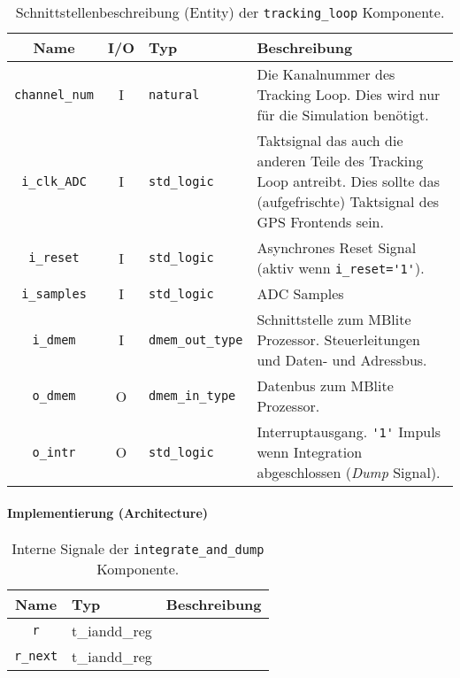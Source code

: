 \begin{table}[htbp]
    \ttabbox
    {
        \caption[Carrier NCO Schnittstelle]{Schnittstellenbeschreibung (Entity) der \lstinline$tracking_loop$ Komponente.}
        \label{Tab_tracking_loop_Entity}
    }
    {
    \begin{tabular}{c c  p{2cm} p{6cm}}
        \toprule
        Name                    & I/O	& Typ				& Beschreibung \\
        \midrule
        \lstinline$channel_num$	& I	& \lstinline$natural$		& Die Kanalnummer des Tracking Loop. Dies wird nur für die Simulation benötigt. \\
        \lstinline$i_clk_ADC$	& I	& \lstinline$std_logic$		& Taktsignal das auch die anderen Teile des Tracking Loop antreibt. Dies sollte das (aufgefrischte) Taktsignal des GPS Frontends sein.\\
        \lstinline$i_reset$	& I	& \lstinline$std_logic$		& Asynchrones Reset Signal (aktiv wenn \lstinline$i_reset='1'$). \\
        \lstinline$i_samples$	& I	& \lstinline$std_logic$		& ADC Samples \\
        \lstinline$i_dmem$	& I	& \lstinline$dmem_out_type$	& Schnittstelle zum MBlite Prozessor. Steuerleitungen und Daten- und Adressbus. \\
        \lstinline$o_dmem$	& O	& \lstinline$dmem_in_type$	& Datenbus zum MBlite Prozessor. \\
        \lstinline$o_intr$	& O	& \lstinline$std_logic$		& Interruptausgang. \lstinline$'1'$ Impuls wenn Integration abgeschlossen (\emph{Dump} Signal).\\
        \bottomrule
    \end{tabular}
}
\end{table}

\paragraph{Implementierung (Architecture)}

\begin{table}[htbp]
    \ttabbox
    {
        \caption[Carrier NCO interne Signale]{Interne Signale der \lstinline$integrate_and_dump$ Komponente.}
        \label{TabIandD_ArchSignals}
    }
    {
    \begin{tabular}{c  p{2cm} p{6cm}}
        \toprule
        Name      		& Typ         & Beschreibung \\
        \midrule
        \lstinline$r$		& t_iandd_reg & \\
        \lstinline$r_next$	& t_iandd_reg & \\
        \bottomrule
    \end{tabular}
}
\end{table}

